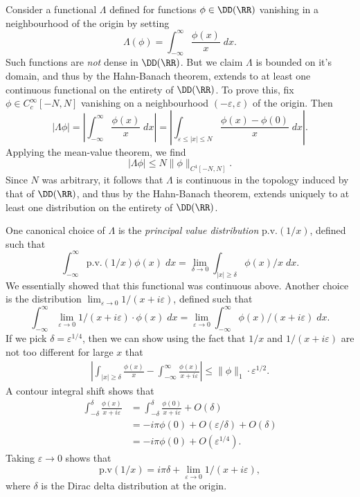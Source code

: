 \begin{example}
    Consider a functional $\Lambda$ defined for functions $\phi \in \DD(\RR)$ vanishing in a neighbourhood of the origin by setting
    \[ \Lambda(\phi) = \int_{-\infty}^\infty \frac{\phi(x)}{x}\; dx. \]
    Such functions are \emph{not} dense in $\DD(\RR)$. But we claim $\Lambda$ is bounded on it's domain, and thus by the Hahn-Banach theorem, extends to at least one continuous functional on the entirety of $\DD(\RR)$. To prove this, fix $\phi \in C_c^\infty[-N,N]$ vanishing on a neighbourhood $(-\varepsilon,\varepsilon)$ of the origin. Then
    \[ |\Lambda \phi| = \left| \int_{-\infty}^\infty \frac{\phi(x)}{x}\; dx \right| = \left| \int_{\varepsilon \leq |x| \leq N} \frac{\phi(x) - \phi(0)}{x}\; dx \right|. \]
    Applying the mean-value theorem, we find
    \[ |\Lambda \phi| \leq N \| \phi \|_{C^1[-N,N]}. \]
    Since $N$ was arbitrary, it follows that $\Lambda$ is continuous in the topology induced by that of $\DD(\RR)$, and thus by the Hahn-Banach theorem, extends uniquely to at least one distribution on the entirety of $\DD(\RR)$.

    One canonical choice of $\Lambda$ is the \emph{principal value distribution} $\text{p.v.}(1/x)$, defined such that
    \[ \int_{-\infty}^\infty \text{p.v.}(1/x) \phi(x)\; dx = \lim_{\delta \to 0} \int_{|x| \geq \delta} \phi(x) / x\; dx. \]
    We essentially showed that this functional was continuous above. Another choice is the distribution $\lim_{\varepsilon \to 0} 1/(x + i \varepsilon)$, defined such that
    \[ \int_{-\infty}^\infty \lim_{\varepsilon \to 0} 1/(x + i \varepsilon) \cdot \phi(x)\; dx = \lim_{\varepsilon \to 0} \int_{-\infty}^\infty \phi(x) / (x + i \varepsilon)\; dx. \]
    If we pick $\delta = \varepsilon^{1/4}$, then we can show using the fact that $1/x$ and $1/(x + i \varepsilon)$ are not too different for large $x$ that
    \begin{align*}
        \left| \int_{|x| \geq \delta} \frac{\phi(x)}{x} - \int_{-\infty}^\infty \frac{\phi(x)}{x + i\varepsilon} \right| \leq \| \phi \|_1 \cdot \varepsilon^{1/2}.
    \end{align*}
    A contour integral shift shows that
    \begin{align*}
        \int_{-\delta}^\delta \frac{\phi(x)}{x + i\varepsilon} &= \int_{-\delta}^\delta \frac{\phi(0)}{x + i \varepsilon} + O(\delta)\\
        &= -i \pi \phi(0) + O(\varepsilon / \delta) + O(\delta)\\
        &= -i \pi \phi(0) + O(\varepsilon^{1/4}).
    \end{align*}
    Taking $\varepsilon \to 0$ shows that
    \[ \text{p.v}(1/x) = i \pi \delta + \lim_{\varepsilon \to 0} 1/(x + i \varepsilon), \]
    where $\delta$ is the Dirac delta distribution at the origin.


\end{example}
